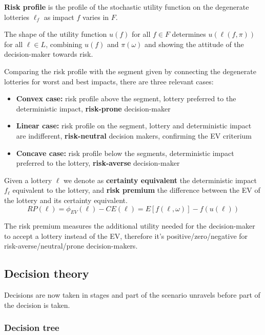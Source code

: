 \textbf{Risk profile} is the profile of the stochastic utility function on the degenerate lotteries $\ell_f$ as impact $f$ varies in $F$. 

The shape of the utility function $u(f)$ for all $f \in F$ determines $u (\ell (f, \pi))$ for all $\ell \in L$, combining $u(f)$ and $\pi (\omega)$ and showing the attitude of the decision-maker towards risk. 

Comparing the risk profile with the segment given by connecting the degenerate lotteries for worst and best impacts, there are three relevant cases: 
\begin{itemize}
	\item \textbf{Convex case:} risk profile above the segment, lottery preferred to the deterministic impact, \textbf{risk-prone} decision-maker
	
	\item \textbf{Linear case:} risk profile on the segment, lottery and deterministic impact are indifferent, \textbf{risk-neutral} decision makers, confirming the EV criterium
	
	\item \textbf{Concave case:} risk profile below the segments, deterministic impact preferred to the lottery, \textbf{risk-averse} decision-maker
\end{itemize}

Given a lottery $\ell$ we denote as \textbf{certainty equivalent} the deterministic impact $f_\ell$ equivalent to the lottery, and \textbf{risk premium} the difference between the EV of the lottery and its certainty equivalent.
$$ RP (\ell) = \phi_{EV} (\ell) - CE (\ell) = E[f(\ell, \omega)] - f(u(\ell)) $$

The risk premium measures the additional utility needed for the decision-maker to accept a lottery instead of the EV, therefore it's positive/zero/negative for risk-averse/neutral/prone decision-makers.

\subsection{Decision theory}

Decisions are now taken in stages and part of the scenario unravels before part of the decision is taken. 

\subsubsection{Decision tree}

